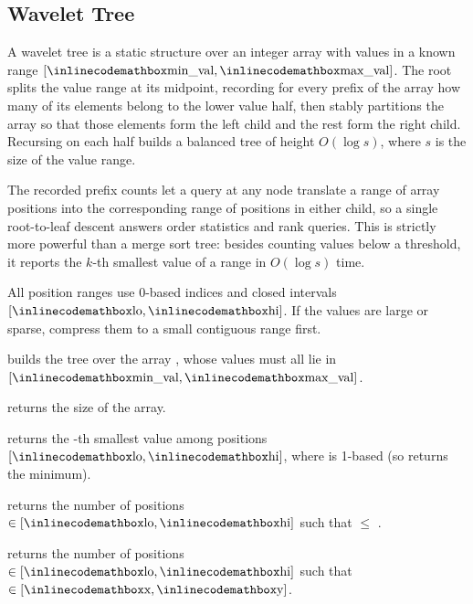 \subsection{Wavelet Tree}
\label{sec:2.5.13}
A wavelet tree is a static structure over an integer array with values in a known range $[{\inlinecodemath{min\_val}}, {\inlinecodemath{max\_val}}]$. The root splits the value range at its midpoint, recording for every prefix of the array how many of its elements belong to the lower value half, then stably partitions the array so that those elements form the left child and the rest form the right child. Recursing on each half builds a balanced tree of height $O(\log s)$, where $s$ is the size of the value range.

The recorded prefix counts let a query at any node translate a range of array positions into the corresponding range of positions in either child, so a single root-to-leaf descent answers order statistics and rank queries. This is strictly more powerful than a merge sort tree: besides counting values below a threshold, it reports the $k$-th smallest value of a range in $O(\log s)$ time.

All position ranges use 0-based indices and closed intervals $[{\inlinecodemath{lo}}, {\inlinecodemath{hi}}]$. If the values are large or sparse, compress them to a small contiguous range first.

\begin{compactitem}
  \item {} builds the tree over the array , whose values must all lie in $[{\inlinecodemath{min\_val}}, {\inlinecodemath{max\_val}}]$.
  \item {} returns the size of the array.
  \item {} returns the -th smallest value among positions $[{\inlinecodemath{lo}}, {\inlinecodemath{hi}}]$, where  is 1-based (so  returns the minimum).
  \item {} returns the number of positions  $\in [{\inlinecodemath{lo}}, {\inlinecodemath{hi}}]$ such that  $\leq$ .
  \item {} returns the number of positions  $\in [{\inlinecodemath{lo}}, {\inlinecodemath{hi}}]$ such that  $\in [{\inlinecodemath{x}}, {\inlinecodemath{y}}]$.
\end{compactitem}

